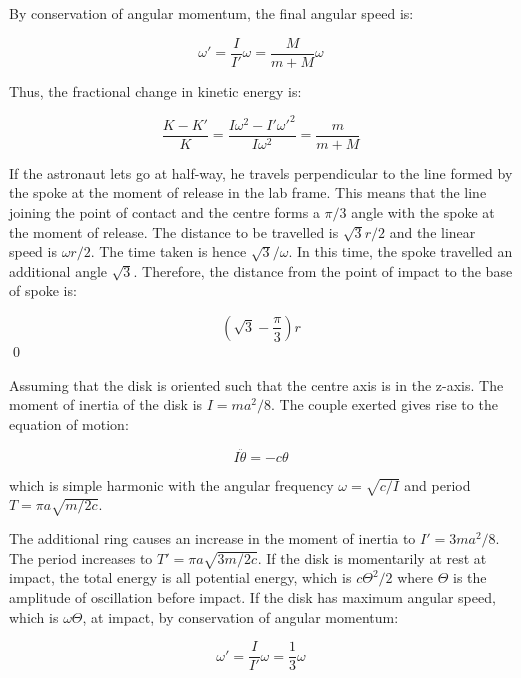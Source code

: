 \documentclass[12pt]{article}
\begin{document}
By conservation of angular momentum, the final angular speed is:

\begin{equation}
    \omega' = \frac{I}{I'} \omega = \frac{M}{m + M} \omega
\end{equation}

Thus, the fractional change in kinetic energy is:

\begin{equation}
    \frac{K - K'}{K} = \frac{I\omega^{2} - I'\omega'^{2}}{I\omega^{2}} = \frac{m}{m + M}
\end{equation}

If the astronaut lets go at half-way, he travels perpendicular to the line formed by the spoke at the moment of release in the lab frame. This means that the line joining the point of contact and the centre forms a $\pi/3$ angle with the spoke at the moment of release. The distance to be travelled is $\sqrt{3}r/2$ and the linear speed is $\omega r/2$. The time taken is hence $\sqrt{3}/\omega$. In this time, the spoke travelled an additional angle $\sqrt{3}$. Therefore, the distance from the point of impact to the base of spoke is:

\begin{equation}
    \left( \sqrt{3} - \frac{\pi}{3} \right) r
\end{equation}
\qed


Assuming that the disk is oriented such that the centre axis is in the z-axis. The moment of inertia of the disk is $I = ma^{2}/8$. The couple exerted gives rise to the equation of motion:

\begin{equation}
    I \ddot{\theta} = -c\theta
\end{equation}

which is simple harmonic with the angular frequency $\omega = \sqrt{c/I}$ and period $T = \pi a \sqrt{m/2c}$.

The additional ring causes an increase in the moment of inertia to $I' = 3ma^{2}/8$. The period increases to $T' = \pi a \sqrt{3m/2c}$. If the disk is momentarily at rest at impact, the total energy is all potential energy, which is $c\Theta^{2}/2$ where $\Theta$ is the amplitude of oscillation before impact. If the disk has maximum angular speed, which is $\omega \Theta$, at impact, by conservation of angular momentum:

\begin{equation}
    \omega' = \frac{I}{I'} \omega = \frac{1}{3} \omega
\end{equation}
\end{document}
